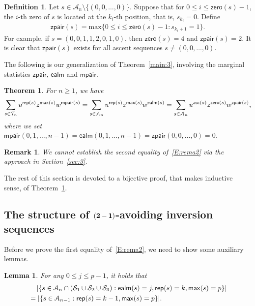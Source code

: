 \documentclass[12pt]{amsart}
\newcounter{mycount}
\theoremstyle{plain}
\newtheorem{theorem}[mycount]{Theorem}
\newtheorem{lemma}[mycount]{Lemma}
\newtheorem{remark}{Remark}
\theoremstyle{definition}
\newtheorem{definition}{Definition}
\theoremstyle{example}
\theoremstyle{remark}
\numberwithin{equation}{section}
\numberwithin{figure}{section}
\newcommand{\asc}{\mathsf{asc}}
\def\max{\mathsf{max}}
\def\zero{\mathsf{zero}}
\def\rep{\mathsf{rep}}
\def\maxx{\mathrm{max}}
\def\ealm{\mathsf{ealm}}
\def\zpair{\mathsf{zpair}}
\def\mpair{\mathsf{mpair}}
\def\A{\mathcal{A}}
\def\T{\CMcal{T}}
\begin{document}
\begin{definition}
Let $s\in\A_n\setminus\{(0,0,\ldots,0)\}$. Suppose that for $0\le i\le \zero(s)-1$, the $i$-th zero of $s$ is located at the $k_{i}$-th position, that is, $s_{k_{i}}=0$. Define
\begin{align*}
\zpair(s)=\maxx\{0\le i\le \zero(s)-1:s_{k_{i}+1}=1\}.
\end{align*}
For example, if $s=(0,0,1,1,2,0,1,0)$, then $\zero(s)=4$ and $\zpair(s)=2$. It is clear that $\zpair(s)$ exists for all ascent sequences $s\ne (0,0,\ldots,0)$.
\end{definition}

The following is our generalization of Theorem~\ref{main:3}, involving  the marginal statistics $\zpair$, $\ealm$ and $\mpair$.
\begin{theorem}\label{T:main3}
For $n\geq1$, we have
\begin{equation}\label{E:rema2}
\sum_{s\in\T_n}
u^{\rep(s)}z^{\max(s)}w^{\mpair(s)}=\sum_{s\in\A_n}
u^{\rep(s)}z^{\max(s)}w^{\ealm(s)}=
\sum_{s\in\A_n}
u^{\asc(s)}z^{\zero(s)}w^{\zpair(s)},
\end{equation}
where we set $\mpair(0,1,\ldots,n-1)=\ealm(0,1,\ldots,n-1)=\zpair(0,0,\ldots,0)=0$.
\end{theorem}

\begin{remark}

We cannot establish the second equality of~\eqref{E:rema2}  via the approach in Section~\ref{sec:3}.
\end{remark}

The rest of this section is devoted to a bijective proof,  that makes inductive sense, of Theorem~\ref{T:main3}. 



\subsection{The  structure of $({\bf2-1})$-avoiding inversion sequences}



Before we prove the first equality of~\eqref{E:rema2}, we need to show some auxiliary lemmas.
\begin{lemma}\label{L:c1}
For any $0\le j\le p-1$, it holds that
\begin{align*}
&\,\quad \vert\{s\in \A_n\cap(\CMcal{S}_1\cup\CMcal{S}_2\cup\CMcal{S}_3): \ealm(s)=j,\rep(s)=k, \max(s)=p\}\vert\\
&=\vert\{s\in \A_{n-1}: \rep(s)=k-1, \max(s)=p\}\vert.
\end{align*}
\end{lemma}
\end{document}
